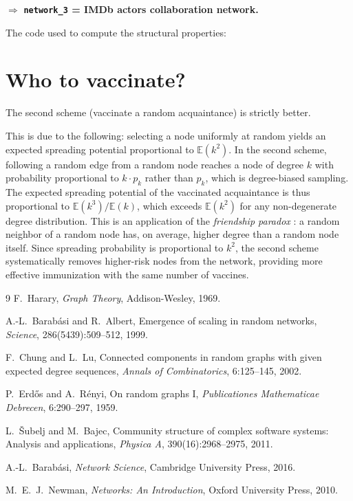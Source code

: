 \documentclass[12pt]{article}
\theoremstyle{definition}
\begin{document}
\vspace{0.5em}
\noindent
$\Rightarrow$ \textbf{\texttt{network\_3} = IMDb actors collaboration network.}

\vspace{1em}
\noindent
The code used to compute the structural properties:



\newpage
\section{Who to vaccinate?}

The second scheme (vaccinate a random acquaintance) is strictly better.

\noindent
This is due to the following: selecting a node uniformly at random yields an expected spreading potential proportional to $\mathbb E(k^2)$. In the second scheme, following a random edge from a random node reaches a node of degree $k$ with probability proportional to $k \cdot p_k$ rather than $p_k$, which is degree-biased sampling. The expected spreading potential of the vaccinated acquaintance is thus proportional to $\mathbb E(k^3) / \mathbb E(k)$, which exceeds $\mathbb E(k^2)$ for any non-degenerate degree distribution. This is an application of the \emph{friendship paradox} \cite{newman2010networks}: a random neighbor of a random node has, on average, higher degree than a random node itself. Since spreading probability is proportional to $k^2$, the second scheme systematically removes higher-risk nodes from the network, providing more effective immunization with the same number of vaccines.


\begin{thebibliography}{9}
  F.~Harary, \emph{Graph Theory}, Addison-Wesley, 1969.

  A.-L.~Barab\'asi and R.~Albert,
  Emergence of scaling in random networks,
  \emph{Science}, 286(5439):509--512, 1999.

  F.~Chung and L.~Lu,
  Connected components in random graphs with given expected degree sequences,
  \emph{Annals of Combinatorics}, 6:125--145, 2002.

  P.~Erd\H{o}s and A.~R\'enyi,
  On random graphs I,
  \emph{Publicationes Mathematicae Debrecen}, 6:290--297, 1959.

  L.~\v{S}ubelj and M.~Bajec,
  Community structure of complex software systems: Analysis and applications,
  \emph{Physica A}, 390(16):2968--2975, 2011.

  A.-L.~Barab\'asi, \emph{Network Science}, Cambridge University Press, 2016.

  M.~E.~J.~Newman, \emph{Networks: An Introduction}, Oxford University Press, 2010.
\end{thebibliography}


\end{document}
